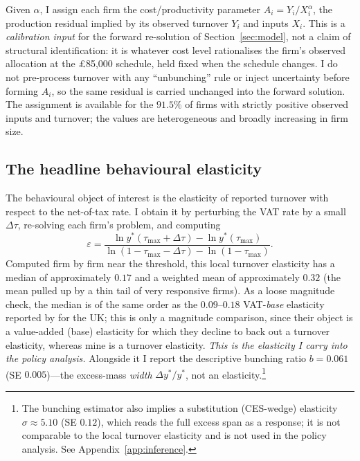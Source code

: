 Given $\alpha$, I assign each firm the cost/productivity parameter
$A_i = Y_i / X_i^{\alpha}$, the production residual implied by its observed
turnover $Y_i$ and inputs $X_i$. This is a \emph{calibration input} for the
forward re-solution of Section~\ref{sec:model}, not a claim of structural
identification: it is whatever cost level rationalises the firm's observed
allocation at the \pounds85{,}000 schedule, held fixed when the schedule changes.
I do not pre-process turnover with any ``unbunching'' rule or inject uncertainty
before forming $A_i$, so the same residual is carried unchanged into the forward
solution. The assignment is available for the $91.5\%$ of firms with strictly
positive observed inputs and turnover; the values are heterogeneous and broadly
increasing in firm size.

\subsection{The headline behavioural elasticity}
\label{ssec:elasticities}

The behavioural object of interest is the elasticity of reported turnover with
respect to the net-of-tax rate. I obtain it by perturbing the VAT rate by a
small $\Delta\tau$, re-solving each firm's problem, and computing
\[
  \varepsilon
  = \frac{\ln y^{*}(\tau_{\max}+\Delta\tau) - \ln y^{*}(\tau_{\max})}
         {\ln(1-\tau_{\max}-\Delta\tau) - \ln(1-\tau_{\max})} .
\]
Computed firm by firm near the threshold, this local turnover elasticity has a
median of approximately $\mathbf{0.17}$ and a weighted mean of approximately
$0.32$ (the mean pulled up by a thin tail of very responsive firms). As a loose
magnitude check, the median is of the same order as the $0.09$--$0.18$
VAT-\emph{base} elasticity reported by \citet{liuetal2021} for the UK; this is
only a magnitude comparison, since their object is a value-added (base) elasticity
for which they decline to back out a turnover elasticity, whereas mine is a
turnover elasticity. \emph{This is the elasticity I carry into the policy
analysis.} Alongside it I report the descriptive bunching ratio $b=0.061$
(SE $0.005$)---the excess-mass \emph{width} $\Delta y^{*}/y^{*}$, not an
elasticity.\footnote{The bunching estimator also implies a substitution
(CES-wedge) elasticity $\sigma\approx5.10$ (SE $0.12$), which reads the full
excess span as a response; it is not comparable to the local turnover elasticity
and is not used in the policy analysis. See Appendix~\ref{app:inference}.}

